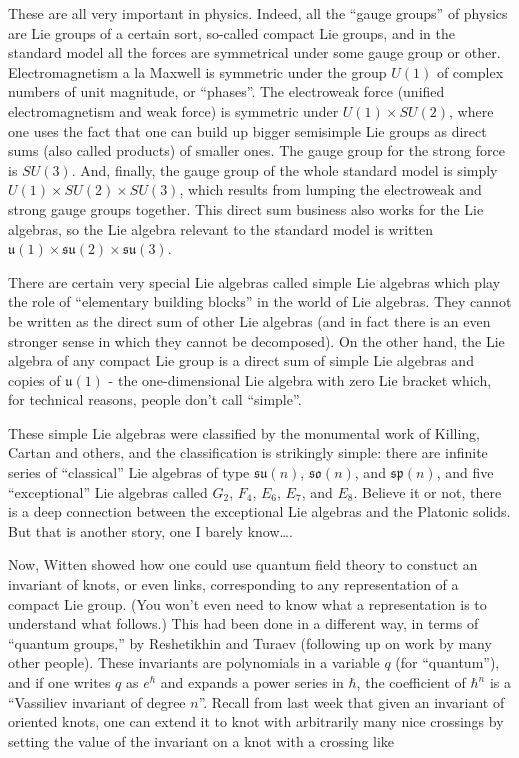 \documentclass{article}
\begin{document}
These are all very important in physics. Indeed, all the ``gauge
groups'' of physics are Lie groups of a certain sort, so-called compact
Lie groups, and in the standard model all the forces are symmetrical
under some gauge group or other. Electromagnetism a la Maxwell is
symmetric under the group \(U(1)\) of complex numbers of unit magnitude,
or ``phases''. The electroweak force (unified electromagnetism and weak
force) is symmetric under \(U(1) \times SU(2)\), where one uses the fact
that one can build up bigger semisimple Lie groups as direct sums (also
called products) of smaller ones. The gauge group for the strong force
is \(SU(3)\). And, finally, the gauge group of the whole standard model
is simply \(U(1) \times SU(2) \times SU(3)\), which results from lumping
the electroweak and strong gauge groups together. This direct sum
business also works for the Lie algebras, so the Lie algebra relevant to
the standard model is written
\(\mathfrak{u}(1) \times \mathfrak{su}(2) \times \mathfrak{su}(3)\).

There are certain very special Lie algebras called simple Lie algebras
which play the role of ``elementary building blocks'' in the world of
Lie algebras. They cannot be written as the direct sum of other Lie
algebras (and in fact there is an even stronger sense in which they
cannot be decomposed). On the other hand, the Lie algebra of any compact
Lie group is a direct sum of simple Lie algebras and copies of
\(\mathfrak{u}(1)\) - the one-dimensional Lie algebra with zero Lie
bracket which, for technical reasons, people don't call ``simple''.

These simple Lie algebras were classified by the monumental work of
Killing, Cartan and others, and the classification is strikingly simple:
there are infinite series of ``classical'' Lie algebras of type
\(\mathfrak{su}(n)\), \(\mathfrak{so}(n)\), and \(\mathfrak{sp}(n)\),
and five ``exceptional'' Lie algebras called \(G_2\), \(F_4\), \(E_6\),
\(E_7\), and \(E_8\). Believe it or not, there is a deep connection
between the exceptional Lie algebras and the Platonic solids. But that
is another story, one I barely know\ldots.

Now, Witten showed how one could use quantum field theory to constuct an
invariant of knots, or even links, corresponding to any representation
of a compact Lie group. (You won't even need to know what a
representation is to understand what follows.) This had been done in a
different way, in terms of ``quantum groups,'' by Reshetikhin and Turaev
(following up on work by many other people). These invariants are
polynomials in a variable \(q\) (for ``quantum''), and if one writes
\(q\) as \(e^\hbar\) and expands a power series in \(\hbar\), the
coefficient of \(\hbar^n\) is a ``Vassiliev invariant of degree \(n\)''.
Recall from last week that given an invariant of oriented knots, one can
extend it to knot with arbitrarily many nice crossings by setting the
value of the invariant on a knot with a crossing like
\end{document}
